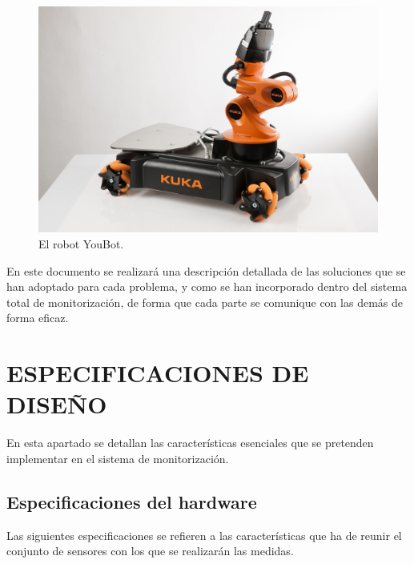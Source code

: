 \documentclass[12pt, a4paper]{report}
\begin{document}
\begin{figure}[h]
	\centering
		\includegraphics[scale=0.2]{../img/youbot.png} 
	\caption[El robot YouBot]{El robot YouBot.} 
	\label{fig: youbot}
\end{figure}

En este documento se realizará una descripción detallada de las soluciones que se han adoptado para cada problema, y como se han incorporado dentro del sistema total de monitorización, de forma que cada parte se comunique con las demás de forma eficaz.

\chapter{ESPECIFICACIONES DE DISEÑO}

En esta apartado se detallan las características esenciales que se pretenden implementar en el sistema de monitorización. 

\section{Especificaciones del hardware}

Las siguientes especificaciones se refieren a las características que ha de reunir el conjunto de sensores con los que se realizarán las medidas.
\end{document}
